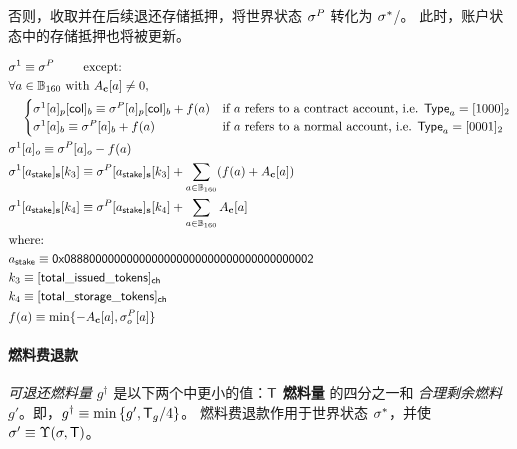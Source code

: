 否则，\name 收取并在后续退还存储抵押，将世界状态 $\mathbf{\sigma}^P$ 转化为 $\mathbf{\sigma}^*$/。
此时，账户状态中的存储抵押也将被更新。

\begin{align}
	&\st^1  \eqdef \st^{P} \qquad \mbox{  except:}\\
	&\forall a \in \B_{160} \text{ with }  A_{\bf c}[a]\neq 0, \\
	&\quad \begin{cases}
	\st^1[a]_p[{\sf col}]_b \eqdef \st^{P}[a]_p[{\sf col}]_b + f(a) & \mbox{if $a$ refers to a contract account, i.e. $\mathsf{Type}_{a}=\typecontract$} \\
	\st^1[a]_b \eqdef \st^{P}[a]_b + f(a) & \mbox{if $a$ refers to a normal account, i.e. $\mathsf{Type}_{a}= \typenormal$}
	\end{cases}\\
	& \st^1[a]_o \eqdef \st^P[a]_o - f(a)\\ 
	&\st^1[a_{\sf stake}]_{\bf s}[k_3] \eqdef \st^P[a_{\sf stake}]_{\bf s}[k_3] + \sum_{a\in \B_{160}}(f(a) + A_{\bf c}[a]) \\
	&\st^1[a_{\sf stake}]_{\bf s}[k_4] \eqdef \st^P[a_{\sf stake}]_{\bf s}[k_4] + \sum_{a\in \B_{160}}A_{\bf c}[a] \\
	&\mbox{where:}  \\
	&a_{\sf stake} \eqdef \stakingcontract \\ 
	&k_3 \eqdef {\sf [total\char`_issued\char`_tokens]_{\sf ch}}  \\ 
	&k_4 \eqdef {\sf [total\char`_storage\char`_tokens]_{\sf ch}}  \\ 
	& f(a) \eqdef \min\{-A_{\bf c}[a], \st^P_o[a]\}
\end{align}

\paragraph{燃料费退款}

\emph{可退还燃料量} $g^{\dagger}$ 是以下两个中更小的值：$\textsf{T}$ \textbf{燃料量} 的四分之一和 \emph{合理剩余燃料} $g'$。即，$g^{\dagger}\equiv \min{\left \{{g', \textsf{T}_g/4} \right \}}$。
燃料费退款作用于世界状态 $\mathbf{\sigma}^{*}$，并使 $\mathbf{\sigma}'\equiv \Upsilon(\mathbf{\sigma},\textsf{T})$。

